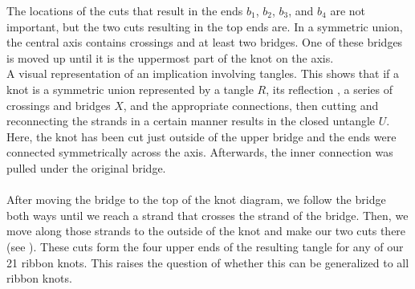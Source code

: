 \documentclass{ws-jktr}
\begin{document}
The locations of the cuts that result in the ends $b_1$, $b_2$, $b_3$, and
$b_4$ are not important, but the two cuts resulting in the top ends are.
In a symmetric union, the central axis contains crossings and at least two
bridges.
One of these bridges is moved up until it is the uppermost part of the knot on
the axis.\newsavebox{\knotR}\\

{A visual representation of an implication involving tangles.
This shows that if a knot is a symmetric union represented by a tangle $R$, its
reflection \usebox{\knotR}, a series of crossings and bridges $X$, and the
appropriate connections, then cutting and reconnecting the strands in a certain
manner results in the closed untangle $U$.
Here, the knot has been cut just outside of the upper bridge and the ends were
connected symmetrically across the axis.
Afterwards, the inner connection was pulled under the original bridge.}\\\\

After moving the bridge to the top of the knot diagram, we follow the bridge
both ways until we reach a strand that crosses the strand of the bridge.
Then, we move along those strands to the outside of the knot and make our two
cuts there (see \figQuestion).
These cuts form the four upper ends of the resulting tangle for any of our 21
ribbon knots.
This raises the question of whether this can be generalized to all ribbon
knots.\\
\end{document}
